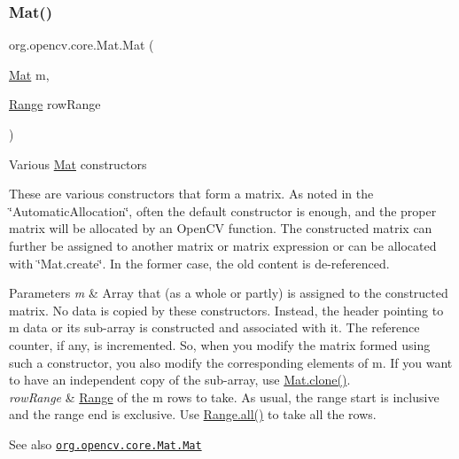 \subsubsection{\texorpdfstring{Mat()}{Mat()}\hspace{0.1cm}{\footnotesize\ttfamily [8/9]}}
{\footnotesize\ttfamily org.\+opencv.\+core.\+Mat.\+Mat (\begin{DoxyParamCaption}\item[{\mbox{\hyperlink{classorg_1_1opencv_1_1core_1_1_mat}{Mat}}}]{m,  }\item[{\mbox{\hyperlink{classorg_1_1opencv_1_1core_1_1_range}{Range}}}]{row\+Range }\end{DoxyParamCaption})}

Various \mbox{\hyperlink{classorg_1_1opencv_1_1core_1_1_mat}{Mat}} constructors

These are various constructors that form a matrix. As noted in the \char`\"{}\+Automatic\+Allocation\char`\"{}, often the default constructor is enough, and the proper matrix will be allocated by an Open\+CV function. The constructed matrix can further be assigned to another matrix or matrix expression or can be allocated with \char`\"{}\+Mat.\+create\char`\"{}. In the former case, the old content is de-\/referenced.


\begin{DoxyParams}{Parameters}
{\em m} & Array that (as a whole or partly) is assigned to the constructed matrix. No data is copied by these constructors. Instead, the header pointing to {\ttfamily m} data or its sub-\/array is constructed and associated with it. The reference counter, if any, is incremented. So, when you modify the matrix formed using such a constructor, you also modify the corresponding elements of {\ttfamily m}. If you want to have an independent copy of the sub-\/array, use {\ttfamily \mbox{\hyperlink{classorg_1_1opencv_1_1core_1_1_mat_a7e40ecb438d2ec75e24e209b7bee0be2}{Mat.\+clone()}}}. \\
\hline
{\em row\+Range} & \mbox{\hyperlink{classorg_1_1opencv_1_1core_1_1_range}{Range}} of the {\ttfamily m} rows to take. As usual, the range start is inclusive and the range end is exclusive. Use {\ttfamily \mbox{\hyperlink{classorg_1_1opencv_1_1core_1_1_range_a2dd4a07a9715665aacee5c7cdf79a175}{Range.\+all()}}} to take all the rows.\\
\hline
\end{DoxyParams}
\begin{DoxySeeAlso}{See also}
\href{http://docs.opencv.org/modules/core/doc/basic_structures.html#mat-mat}{\tt org.\+opencv.\+core.\+Mat.\+Mat} 
\end{DoxySeeAlso}
\mbox{\label{classorg_1_1opencv_1_1core_1_1_mat_aa6ed352a1abaac27fc5f4f8f467269ea}} 
